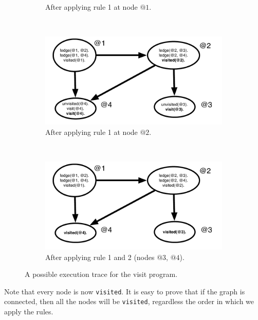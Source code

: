 \begin{figure}[h]
\begin{subfigure}[b]{0.5\textwidth}
                \caption{After applying rule 1 at node $@1$.}
                \label{fig:exec_trace2}
        \end{subfigure}\\
        \begin{subfigure}[b]{0.5\textwidth}
                \includegraphics[width=\textwidth]{execution_trace3}
                \caption{After applying rule 1 at node $@2$.}
                \label{fig:exec_trace3}
        \end{subfigure}%
        ~ %
        \begin{subfigure}[b]{0.5\textwidth}
                  \includegraphics[width=\textwidth]{execution_trace4}
                  \caption{After applying rule 1 and 2 (nodes $@3$, $@4$).}
                  \label{fig:exec_trace4}
          \end{subfigure}
        \caption{A possible execution trace for the visit program.}\label{fig:exec_trace}
\end{figure}

Note that every node is now \texttt{visited}. It is easy to prove that if the graph is
connected, then all the nodes will be \texttt{visited}, regardless the order in which we
apply the rules.

